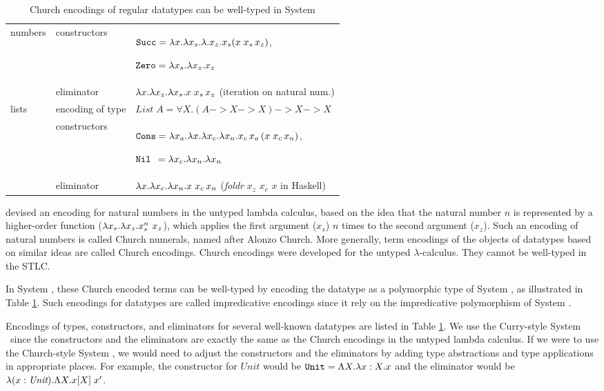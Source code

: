 \begin{table}
\begin{tabular}{p{15mm}|lp{92mm}}
numbers
& constructors          & $\mathtt{Succ} = \lambda x. \lambda x_s. \lambda. x_z. x_s (x\;x_s\,x_z)$,\par
                        $\mathtt{Zero} = \lambda x_s. \lambda x_z. x_z$ \\
& eliminator            & $\lambda x.\lambda x_z. \lambda x_s.x\;x_s\,x_z$ \quad
                        (iteration on natural num.)
        \\\hline
lists
& encoding of type      & $\textit{List}\;A = \forall X. (A -> X -> X) -> X -> X$ \\
& constructors          & $\mathtt{Cons} = \lambda x_a.\lambda x.\lambda x_c.\lambda x_n. x_c\,x_a\,(x\;x_c\,x_n)$,\par
                        $\mathtt{Nil}\;\, = \lambda x_c.\lambda x_n.\lambda x_n$ \\
& eliminator            & $\lambda x.\lambda x_c. \lambda x_n.x\;x_c\,x_n$ \quad
                        (\textit{foldr} $x_z$ $x_c$ $x$ in Haskell)
        \\\hline
\end{tabular}
\caption{Church encodings of regular datatypes can be well-typed in System \F}
\label{tbl:dataF}
\end{table}

\citet{Church41} devised an encoding for natural numbers
in the untyped lambda calculus, based on the idea that the natural number $n$
is represented by a higher-order function ($\lambda x_s.\lambda x_z.x_s^n~x_z$), which
applies the first argument ($x_s$) $n$ times to the second argument ($x_z$).
Such an encoding of natural numbers is called Church numerals, named after
Alonzo Church. More generally, term encodings of the objects of datatypes
based on similar ideas are called Church encodings. Church encodings were
developed for the untyped $\lambda$-calculus. They cannot be 
well-typed in the STLC.

In System \F,
these Church encoded terms can be well-typed by encoding the datatype
as a polymorphic type of System \F, as illustrated in Table \ref{tbl:dataF}.
Such encodings for datatypes are called impredicative encodings
since it rely on the impredicative polymorphism of System \F.

Encodings of types, constructors, and eliminators for
several well-known datatypes are listed in Table \ref{tbl:dataF}.
We use the Curry-style System \F\ since the constructors and the eliminators
are exactly the same as the Church encodings in the untyped lambda calculus.
If we were to use the Church-style System \F, we would need to adjust
the constructors and the eliminators by adding type abstractions and
type applications in appropriate places. For example,
the constructor for $\textit{Unit}$ would be
$\mathtt{Unit} = \Lambda X.\lambda x:X.x$ and the eliminator would be
$\lambda(x:\textit{Unit}).\Lambda X.x[X]\;x'$.

